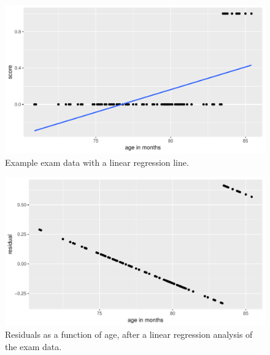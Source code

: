 \documentclass[]{report}\usepackage[]{graphicx}\usepackage[]{color}
\makeatletter
\def\maxwidth{ %
  \ifdim\Gin@nat@width>\linewidth
    \linewidth
  \else
    \Gin@nat@width
  \fi
}
\newenvironment{knitrout}{}{} %
\makeatother
\begin{document}
\begin{knitrout}
\color{fgcolor}\begin{figure}

{\centering \includegraphics[width=\maxwidth]{figure/gen_6-1} 

}

\caption[Example exam data with a linear regression line]{Example exam data with a linear regression line.}\label{fig:gen_6}
\end{figure}


\end{knitrout}
% 
% 
\begin{knitrout}
\color{fgcolor}\begin{figure}

{\centering \includegraphics[width=\maxwidth]{figure/gen_7-1} 

}

\caption[Residuals as a function of age, after a linear regression analysis of the exam data]{Residuals as a function of age, after a linear regression analysis of the exam data.}\label{fig:gen_7}
\end{figure}


\end{knitrout}
\end{document}
